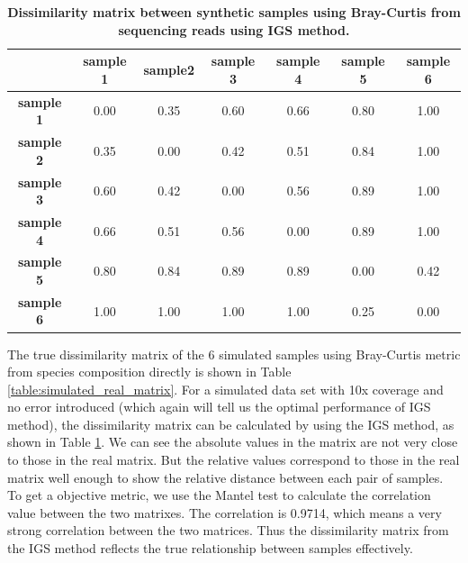 \begin{table}[!ht]
\begin{tabular}{|c|c|c|c|c|c|c|}
\hline
                  & \textbf{sample 1} & \textbf{sample2} & \textbf{sample 3} & \textbf{sample 4} & \textbf{sample 5} & \textbf{sample 6} \\ \hline
\textbf{sample 1} & 0.00              & 0.35             & 0.60              & 0.66              & 0.80              & 1.00              \\ \hline
\textbf{sample 2} & 0.35              & 0.00             & 0.42              & 0.51              & 0.84              & 1.00              \\ \hline
\textbf{sample 3} & 0.60              & 0.42             & 0.00              & 0.56              & 0.89              & 1.00              \\ \hline
\textbf{sample 4} & 0.66              & 0.51             & 0.56              & 0.00              & 0.89              & 1.00              \\ \hline
\textbf{sample 5} & 0.80              & 0.84             & 0.89              & 0.89              & 0.00              & 0.42              \\ \hline
\textbf{sample 6} & 1.00              & 1.00             & 1.00              & 1.00              & 0.25              & 0.00              \\ \hline
\end{tabular}
\caption{\bf Dissimilarity matrix between synthetic samples using Bray-Curtis
from sequencing reads using IGS method. }
\label{table:simulated_matrix1}
\end{table}


The true dissimilarity matrix of the 6 simulated samples using Bray-Curtis 
metric from species composition directly is shown in Table \ref{table:simulated_real_matrix}.
For a simulated data set with 10x coverage and no error introduced 
(which again will tell us the optimal performance of IGS method), the dissimilarity 
matrix can be calculated by using the IGS method, as shown in Table 
\ref{table:simulated_matrix1}. We can see the absolute values in the matrix 
are not very close to those in the real matrix. But the relative values 
correspond to those in the real matrix well enough to show the relative distance 
between each pair of samples. To get a objective metric, we use the
Mantel \cite{Mantel1967} test to calculate the correlation value between the two 
matrixes.
The correlation is 0.9714, which means a very strong correlation 
between the two matrices. Thus the dissimilarity matrix from the IGS method 
reflects the true relationship between samples effectively.

